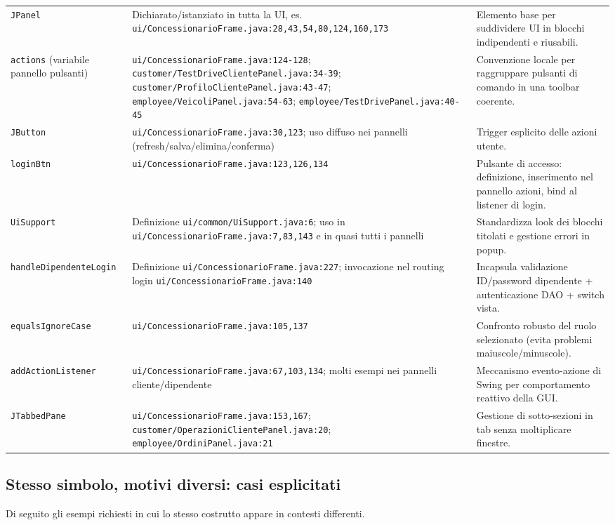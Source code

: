 \documentclass[12pt,a4paper]{article}
\begin{document}
\begin{longtable}{p{} p{} p{}}
\\
\texttt{JPanel} & Dichiarato/istanziato in tutta la UI, es. \texttt{ui/ConcessionarioFrame.java:28,43,54,80,124,160,173} & Elemento base per suddividere UI in blocchi indipendenti e riusabili.
\\
\texttt{actions} (variabile pannello pulsanti) & \texttt{ui/ConcessionarioFrame.java:124-128}; \texttt{customer/TestDriveClientePanel.java:34-39}; \texttt{customer/ProfiloClientePanel.java:43-47}; \texttt{employee/VeicoliPanel.java:54-63}; \texttt{employee/TestDrivePanel.java:40-45} & Convenzione locale per raggruppare pulsanti di comando in una toolbar coerente.
\\
\texttt{JButton} & \texttt{ui/ConcessionarioFrame.java:30,123}; uso diffuso nei pannelli (refresh/salva/elimina/conferma) & Trigger esplicito delle azioni utente.
\\
\texttt{loginBtn} & \texttt{ui/ConcessionarioFrame.java:123,126,134} & Pulsante di accesso: definizione, inserimento nel pannello azioni, bind al listener di login.
\\
\texttt{UiSupport} & Definizione \texttt{ui/common/UiSupport.java:6}; uso in \texttt{ui/ConcessionarioFrame.java:7,83,143} e in quasi tutti i pannelli & Standardizza look dei blocchi titolati e gestione errori in popup.
\\
\texttt{handleDipendenteLogin} & Definizione \texttt{ui/ConcessionarioFrame.java:227}; invocazione nel routing login \texttt{ui/ConcessionarioFrame.java:140} & Incapsula validazione ID/password dipendente + autenticazione DAO + switch vista.
\\
\texttt{equalsIgnoreCase} & \texttt{ui/ConcessionarioFrame.java:105,137} & Confronto robusto del ruolo selezionato (evita problemi maiuscole/minuscole).
\\
\texttt{addActionListener} & \texttt{ui/ConcessionarioFrame.java:67,103,134}; molti esempi nei pannelli cliente/dipendente & Meccanismo evento-azione di Swing per comportamento reattivo della GUI.
\\
\texttt{JTabbedPane} & \texttt{ui/ConcessionarioFrame.java:153,167}; \texttt{customer/OperazioniClientePanel.java:20}; \texttt{employee/OrdiniPanel.java:21} & Gestione di sotto-sezioni in tab senza moltiplicare finestre.
\\
\bottomrule
\end{longtable}

\subsection{Stesso simbolo, motivi diversi: casi esplicitati}
Di seguito gli esempi richiesti in cui lo stesso costrutto appare in contesti differenti.
\end{document}
